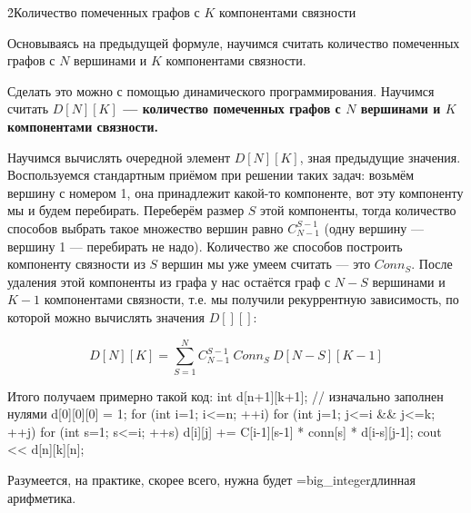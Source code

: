 \h2{Количество помеченных графов с $K$ компонентами связности}

Основываясь на предыдущей формуле, научимся считать количество помеченных графов с $N$ вершинами и $K$ компонентами связности.

Сделать это можно с помощью динамического программирования. Научимся считать \bf{$D[N][K]$} --- количество помеченных графов с $N$ вершинами и $K$ компонентами связности.

Научимся вычислять очередной элемент $D[N][K]$, зная предыдущие значения. Воспользуемся стандартным приёмом при решении таких задач: возьмём вершину с номером 1, она принадлежит какой-то компоненте, вот эту компоненту мы и будем перебирать. Переберём размер $S$ этой компоненты, тогда количество способов выбрать такое множество вершин равно $C_{N-1}^{S-1}$ (одну вершину --- вершину 1 --- перебирать не надо). Количество же способов построить компоненту связности из $S$ вершин мы уже умеем считать --- это $Conn_S$. После удаления этой компоненты из графа у нас остаётся граф с $N-S$ вершинами и $K-1$ компонентами связности, т.е. мы получили рекуррентную зависимость, по которой можно вычислять значения $D[][]$:

$$ D[N][K] = \sum_{S=1}^{N} C_{N-1}^{S-1}\ Conn_S\ D[N-S][K-1] $$

Итого получаем примерно такой код:
\code
int d[n+1][k+1]; // изначально заполнен нулями
d[0][0][0] = 1;
for (int i=1; i<=n; ++i)
	for (int j=1; j<=i && j<=k; ++j)
		for (int s=1; s<=i; ++s)
			d[i][j] += C[i-1][s-1] * conn[s] * d[i-s][j-1];
cout << d[n][k][n];
\endcode

Разумеется, на практике, скорее всего, нужна будет \algohref=big_integer{длинная арифметика}.